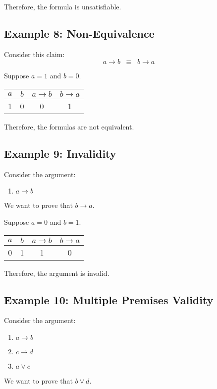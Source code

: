 \documentclass[12pt,a4paper,openany]{article}
\begin{document}
Therefore, the formula is unsatisfiable.

\subsection{Example 8: Non-Equivalence}

Consider this claim:
$$ a \rightarrow b \;\;\equiv\;\; b \rightarrow a $$

Suppose $a = 1$ and $b = 0$.

\begin{center}
\begin{tabular}{|c|c|c|c|}
\hline
$a$ & $b$ & $a \rightarrow b$ & $b \rightarrow a$ \\
\hline
\textcolor{truecolor}{1} & \textcolor{falsecolor}{0} & \textcolor{falsecolor}{0} & \textcolor{truecolor}{1} \\
\hline
\end{tabular}
\end{center}

Therefore, the formulas are not equivalent.

\subsection{Example 9: Invalidity}

Consider the argument:
\begin{enumerate}
    \item $a \rightarrow b$
\end{enumerate}
We want to prove that $b \rightarrow a$.

Suppose $a = 0$ and $b = 1$.

\begin{center}
\begin{tabular}{|c|c|c|c|}
\hline
$a$ & $b$ & $a \rightarrow b$ & $b \rightarrow a$ \\
\hline
\textcolor{falsecolor}{0} & \textcolor{truecolor}{1} & \textcolor{truecolor}{1} & \textcolor{falsecolor}{0} \\
\hline
\end{tabular}
\end{center}

Therefore, the argument is invalid.

\subsection{Example 10: Multiple Premises Validity}

Consider the argument:
\begin{enumerate}
    \item $a \rightarrow b$
    \item $c \rightarrow d$
    \item $a \lor c$
\end{enumerate}
We want to prove that $b \lor d$.
\end{document}
